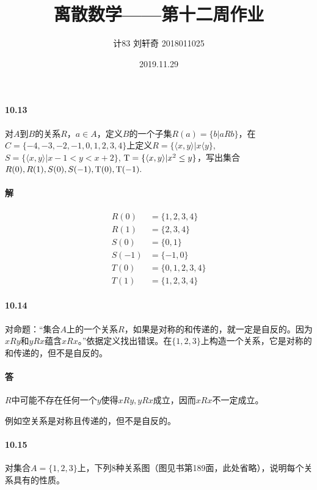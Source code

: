 \documentclass[UTF8]{ctexart}
\title{离散数学——第十二周作业}
\author{计83  刘轩奇  2018011025}
\date{2019.11.29}
\newcommand{\true}{{\rm T}}
\begin{document}
\maketitle

\paragraph{10.13} \label{10.13}
    对$A$到$B$的关系$R$，$a \in A$，定义$B$的一个子集$R(a)=\{b|aRb\}$，在$C=\{-4,-3,-2,-1,0,1,2,3,4\}$上定义$R= \{ \langle x,y \rangle |x \langle y \} $, $S= \{ \langle x,y \rangle |x-1 < y < x+2 \} $, $ \true = \{ \langle x,y \rangle |x^2 \le y \} $，写出集合$R(0), R(1), S(0), S(-1), \true (0), \true (-1).$

\paragraph{解}
    \begin{align*}
        R(0) & = \{ 1,2,3,4 \} \\
        R(1) & = \{ 2,3,4 \} \\
        S(0) & = \{ 0,1 \} \\
        S(-1) & = \{ -1, 0 \} \\
        T(0) & = \{ 0,1,2,3,4 \} \\
        T(1) & = \{ 1,2,3,4 \} 
    \end{align*}

\paragraph{10.14} \label{10.14}
    对命题：“集合$A$上的一个关系$R$，如果是对称的和传递的，就一定是自反的。因为$xRy$和$yRx$蕴含$xRx$。”依据定义找出错误。在$\{1,2,3\}$上构造一个关系，它是对称的和传递的，但不是自反的。

\paragraph{答}
    $R$中可能不存在任何一个$y$使得$xRy,yRx$成立，因而$xRx$不一定成立。

    例如空关系是对称且传递的，但不是自反的。

\paragraph{10.15} \label{10.15}
    对集合$A=\{1,2,3\}$上，下列8种关系图（图见书第189面，此处省略），说明每个关系具有的性质。
\end{document}
